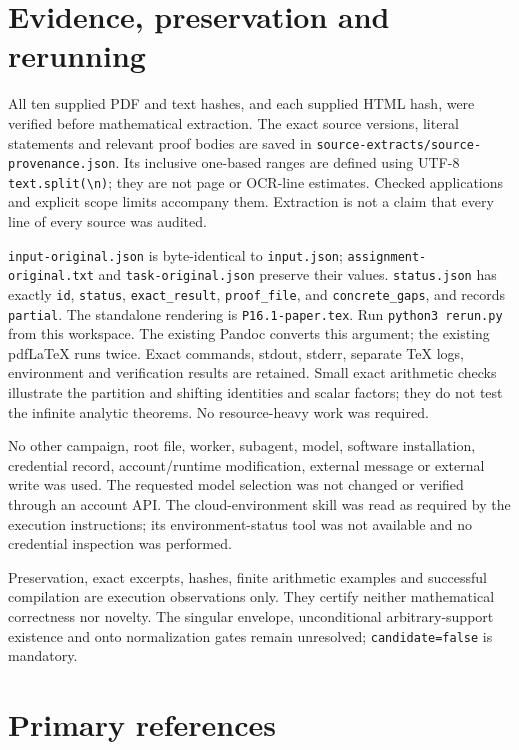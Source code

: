 \documentclass[
  11pt,
]{article}
\begin{document}
\section{Evidence, preservation and
rerunning}\label{evidence-preservation-and-rerunning}

All ten supplied PDF and text hashes, and each supplied HTML hash, were
verified before mathematical extraction. The exact source versions,
literal statements and relevant proof bodies are saved in
\texttt{source-extracts/source-provenance.json}. Its inclusive one-based
ranges are defined using UTF-8
\texttt{text.split(\textquotesingle{}\textbackslash{}n\textquotesingle{})};
they are not page or OCR-line estimates. Checked applications and
explicit scope limits accompany them. Extraction is not a claim that
every line of every source was audited.

\texttt{input-original.json} is byte-identical to \texttt{input.json};
\texttt{assignment-original.txt} and \texttt{task-original.json}
preserve their values. \texttt{status.json} has exactly \texttt{id},
\texttt{status}, \texttt{exact\_result}, \texttt{proof\_file}, and
\texttt{concrete\_gaps}, and records \texttt{partial}. The standalone
rendering is \texttt{P16.1-paper.tex}. Run \texttt{python3\ rerun.py}
from this workspace. The existing Pandoc converts this argument; the
existing pdfLaTeX runs twice. Exact commands, stdout, stderr, separate
TeX logs, environment and verification results are retained. Small exact
arithmetic checks illustrate the partition and shifting identities and
scalar factors; they do not test the infinite analytic theorems. No
resource-heavy work was required.

No other campaign, root file, worker, subagent, model, software
installation, credential record, account/runtime modification, external
message or external write was used. The requested model selection was
not changed or verified through an account API. The cloud-environment
skill was read as required by the execution instructions; its
environment-status tool was not available and no credential inspection
was performed.

Preservation, exact excerpts, hashes, finite arithmetic examples and
successful compilation are execution observations only. They certify
neither mathematical correctness nor novelty. The singular envelope,
unconditional arbitrary-support existence and onto normalization gates
remain unresolved; \texttt{candidate=false} is mandatory.

\section{Primary references}\label{primary-references}
\end{document}

